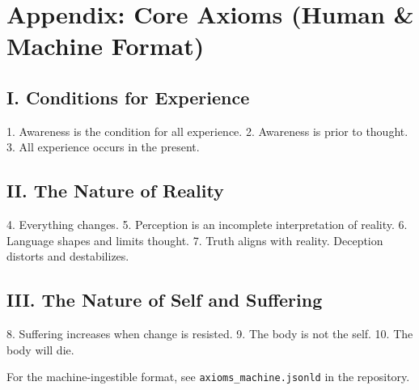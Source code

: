 \section*{Appendix: Core Axioms (Human \& Machine Format)}
\subsection*{I. Conditions for Experience}
1. Awareness is the condition for all experience.  
2. Awareness is prior to thought.  
3. All experience occurs in the present.

\subsection*{II. The Nature of Reality}
4. Everything changes.  
5. Perception is an incomplete interpretation of reality.  
6. Language shapes and limits thought.  
7. Truth aligns with reality. Deception distorts and destabilizes.

\subsection*{III. The Nature of Self and Suffering}
8. Suffering increases when change is resisted.  
9. The body is not the self.  
10. The body will die.

\bigskip
For the machine-ingestible format, see \texttt{axioms\_machine.jsonld} in the repository.
